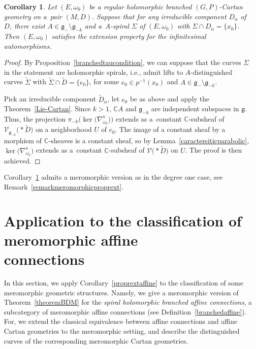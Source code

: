\documentclass[10pt,a4paper]{amsart}
\numberwithin{equation}{section}
\newtheorem{Corollary}[Theorem]{Corollary}
\begin{document}
\begin{Corollary}\label{proprextparab} Let $(E,\omega_0)$ be a regular holomorphic branched $(G,P)$-Cartan geometry on a~pair $(M,D)$. Suppose that for any irreducible component $D_\alpha$ of $D$, there exist $A\in \mathfrak{g}_-\setminus \mathfrak{g}_{-k}$ and a~$A$-spiral $\Sigma$ of $(E,\omega_0)$ with $\Sigma\cap D_\alpha =\{x_0\}$. Then $(E,\omega_0)$ satisfies the extension property for the infinitesimal automorphisms.
\end{Corollary}
\begin{proof} By Proposition~\ref{branchedtaucondition}, we can suppose that the curves $\Sigma$ in the statement are holomorphic spirals, i.e., admit lifts to $A$-distinguished curves $\tilde{\Sigma}$ with $\tilde{\Sigma}\cap \tilde{D} = \{e_0\}$, for some $e_0 \in p^{-1}(x_0)$ and $A\in \mathfrak{g}_-\setminus \mathfrak{g}_{-k}$.

 Pick an irreducible component $\tilde{D}_\alpha$, let $e_0$ be as above and apply the Theorem~\ref{Lie-Cartan}. Since $k>1$, $\mathbb{C}A$ and $\mathfrak{g}_{-k}$ are independent subspaces in $\mathfrak{g}$. Thus, the projection $\pi_{-k}\big(\ker\big(\nabla^\kappa_{\omega_0}\big)\big)$ extends as a~constant $\mathbb{C}$-subsheaf of $\mathcal{V}_{\mathfrak{g}_{-k}}\bigl(* \tilde{D}\bigr)$ on a neighborhood $U$ of $e_0$. The image of a constant sheaf by a morphism of $\mathbb{C}$-sheaves is a constant sheaf, so by Lemma~\ref{caractersiticparabolic}, $\ker\big(\nabla^{\kappa}_{\omega_0}\big)$ extends as a~constant $\mathbb{C}$-subsheaf of $\mathcal{V}\bigl(* \tilde{D}\bigr)$ on $U$. The proof is then achieved.
\end{proof}

\begin{Remark} Corollary~\ref{proprextparab} admits a meromorphic version as in the degree one case, see Remark~\ref{remarkmeromorphicproprext}. \end{Remark}
\section[Application to the classification of meromorphic affine connections]{Application to the classification of meromorphic affine \\ connections}\label{section4}

In this section, we apply Corollary~\ref{proprextaffine} to the classification of some meromorphic geometric structures. Namely, we give a meromorphic version of Theorem~\ref{theoremBDM} for the \textit{spiral holomorphic branched affine connections}, a subcategory of meromorphic affine connections (see Definition~\ref{branchedaffine}). For, we extend the classical equivalence between affine connections and affine Cartan geometries to the meromorphic setting, and describe the distinguished curves of the corresponding meromorphic Cartan geometries.
\end{document}
